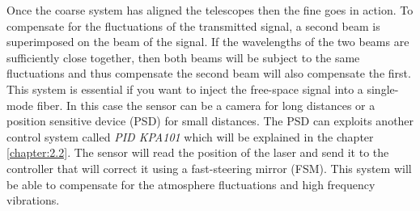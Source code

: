 
Once the coarse system has aligned the telescopes then the fine goes in action. To compensate for the fluctuations of the transmitted signal, a second beam is superimposed on the beam of the signal. If the wavelengths of the two beams are sufficiently close together, then both beams will be subject to the same fluctuations and thus compensate the second beam will also compensate the first.
This system is essential if you want to inject the free-space signal into a single-mode fiber. In this case the sensor can be a camera for long distances or a position sensitive device (PSD) for small distances.
The PSD can exploits another control system called \textit{PID KPA101} which will be explained in the chapter \ref{chapter:2.2}. The sensor will read the position of the laser and send it to the controller that will correct it using a fast-steering mirror (FSM). This system will be able to compensate for the atmosphere fluctuations and high frequency vibrations.

